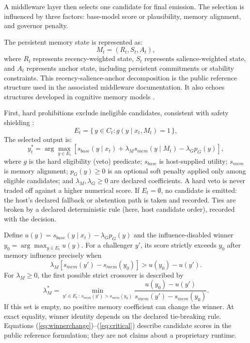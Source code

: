 \documentclass[11pt]{article}
\begin{document}
A middleware layer then selects one candidate for final emission. The selection is influenced by three factors: base-model score or plausibility, memory alignment, and governor penalty.

The persistent memory state is represented as:
\begin{equation}
M_t = (R_t, S_t, A_t),
\end{equation}
where $R_t$ represents recency-weighted state, $S_t$ represents salience-weighted state, and $A_t$ represents anchor state, including persistent commitments or stability constraints. This recency-salience-anchor decomposition is the public reference structure used in the associated middleware documentation. It also echoes structures developed in cognitive memory models \citep{anderson1996act,anderson1991reflections,anderson2004integrated}.

First, hard prohibitions exclude ineligible candidates, consistent with safety shielding \citep{alshiekh2018shielding}:
\begin{equation}
E_t = \{\,y\in C_t : g(y\mid x_t,M_t)=1\,\},\label{eq:eligible}
\end{equation}
The selected output is:
\begin{equation}
y_t^*=\arg\max_{y\in E_t}\left[s_{base}(y\mid x_t)+\lambda_M s_{mem}(y\mid M_t)-\lambda_G p_G(y)\right],\label{eq:selection}
\end{equation}
where $g$ is the hard eligibility (veto) predicate; $s_{base}$ is host-supplied utility; $s_{mem}$ is memory alignment; $p_G(y)\geq0$ is an optional soft penalty applied only among eligible candidates; and $\lambda_M,\lambda_G\geq0$ are declared coefficients. A hard veto is never traded off against a higher numerical score. If $E_t=\emptyset$, no candidate is emitted: the host's declared fallback or abstention path is taken and recorded. Ties are broken by a declared deterministic rule (here, host candidate order), recorded with the decision.

Define $u(y)=s_{base}(y\mid x_t)-\lambda_G p_G(y)$ and the influence-disabled winner $y_0=\arg\max_{y\in E_t}u(y)$. For a challenger $y'$, its score strictly exceeds $y_0$ after memory influence precisely when
\begin{equation}
\lambda_M\left[s_{mem}(y')-s_{mem}(y_0)\right]>u(y_0)-u(y').\label{eq:winnerchange}
\end{equation}
For $\lambda_M\geq0$, the first possible strict crossover is described by
\begin{equation}
\lambda_M^*=\min_{y'\in E_t\, :\,s_{mem}(y')>s_{mem}(y_0)}\frac{u(y_0)-u(y')}{s_{mem}(y')-s_{mem}(y_0)}.\label{eq:critical}
\end{equation}
If this set is empty, no positive memory coefficient can change the winner. At exact equality, winner identity depends on the declared tie-breaking rule. Equations (\ref{eq:winnerchange})--(\ref{eq:critical}) describe candidate scores in the public reference formulation; they are not claims about a proprietary runtime.
\end{document}
